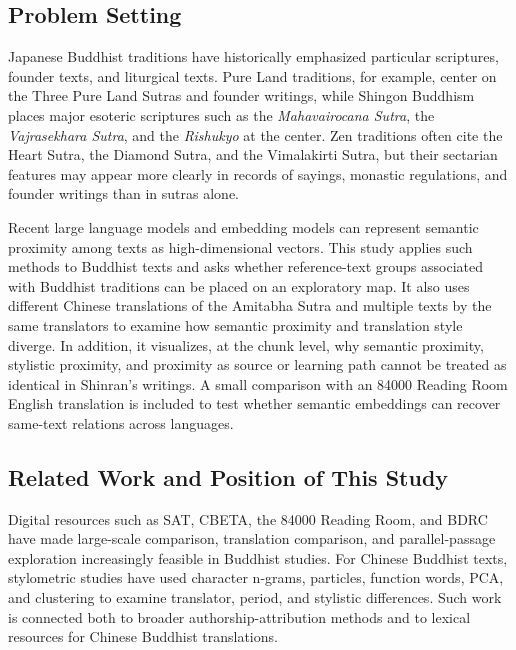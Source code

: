 \documentclass[uplatex,dvipdfmx,11pt,a4paper]{jsarticle}
\begin{document}
\subsection{Problem Setting}

Japanese Buddhist traditions have historically emphasized particular scriptures, founder texts, and liturgical texts. Pure Land traditions, for example, center on the Three Pure Land Sutras and founder writings, while Shingon Buddhism places major esoteric scriptures such as the \textit{Mahavairocana Sutra}, the \textit{Vajrasekhara Sutra}, and the \textit{Rishukyo} at the center. Zen traditions often cite the Heart Sutra, the Diamond Sutra, and the Vimalakirti Sutra, but their sectarian features may appear more clearly in records of sayings, monastic regulations, and founder writings than in sutras alone.

Recent large language models and embedding models can represent semantic proximity among texts as high-dimensional vectors. This study applies such methods to Buddhist texts and asks whether reference-text groups associated with Buddhist traditions can be placed on an exploratory map. It also uses different Chinese translations of the Amitabha Sutra and multiple texts by the same translators to examine how semantic proximity and translation style diverge. In addition, it visualizes, at the chunk level, why semantic proximity, stylistic proximity, and proximity as source or learning path cannot be treated as identical in Shinran's writings. A small comparison with an 84000 Reading Room English translation is included to test whether semantic embeddings can recover same-text relations across languages.

\subsection{Related Work and Position of This Study}

Digital resources such as SAT, CBETA, the 84000 Reading Room, and BDRC have made large-scale comparison, translation comparison, and parallel-passage exploration increasingly feasible in Buddhist studies\cite{sat,cbeta,bdrc,84000-toh106}. For Chinese Buddhist texts, stylometric studies have used character n-grams, particles, function words, PCA, and clustering to examine translator, period, and stylistic differences\cite{hung2010,bingenheimer2017}. Such work is connected both to broader authorship-attribution methods\cite{burrows2002,koppel2009} and to lexical resources for Chinese Buddhist translations\cite{karashima2001}.
\end{document}
